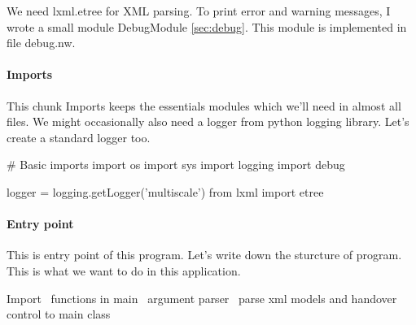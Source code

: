 \documentclass[]{article}%
\begin{document}
  We need {\Tt{}lxml.etree\nwendquote} for XML parsing. To print error and warning messages, I
  wrote a small module {\Tt{}DebugModule\nwendquote} \ref{sec:debug}. This module is
  implemented in file {\Tt{}debug.nw\nwendquote}. 
  
\paragraph{Imports}

  This chunk {\Tt{}Imports\nwendquote} keeps the essentials modules which we'll need in almost
  all files. We might occasionally also need a logger from python {\Tt{}logging\nwendquote}
  library. Let's create a standard logger too.

\endmoddef\nwstartdeflinemarkup{}\nwenddeflinemarkup
# Basic imports
import os 
import sys 
import logging 
import debug 

logger = logging.getLogger('multiscale')
from lxml import etree

\eatline
{}\nwendcode{}\nwdocspar
\paragraph{Entry point}

  This is entry point of this program. Let's write down the sturcture of
  program. This is what we want to do in this application.
  
\nwenddocs{}\endmoddef\nwstartdeflinemarkup\nwenddeflinemarkup
\LA{}Import~{\nwtagstyle{}}\RA{}
\LA{}functions in main~{\nwtagstyle{}}\RA{}
\LA{}argument parser~{\nwtagstyle{}}\RA{}
\LA{}parse xml models and handover control to main class~{\nwtagstyle{}}\RA{}
\end{document}
